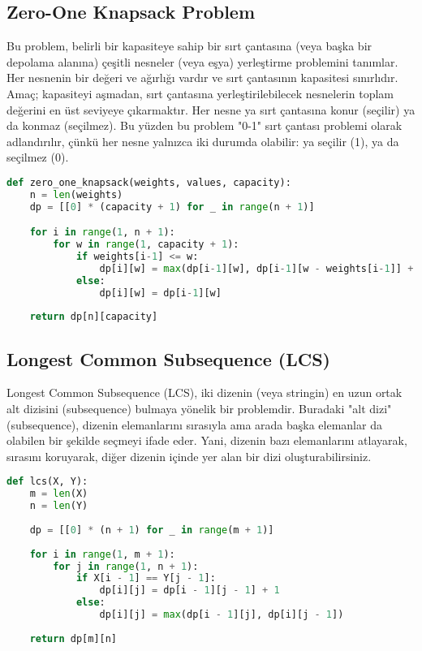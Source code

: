 \newpage

\subsection{Zero-One Knapsack Problem}

Bu problem, belirli bir kapasiteye sahip bir sırt çantasına (veya başka bir depolama alanına) çeşitli nesneler (veya eşya) yerleştirme problemini tanımlar. Her nesnenin bir değeri ve ağırlığı vardır ve sırt çantasının kapasitesi sınırlıdır. Amaç; kapasiteyi aşmadan, sırt çantasına yerleştirilebilecek nesnelerin toplam değerini en üst seviyeye çıkarmaktır. Her nesne ya sırt çantasına konur (seçilir) ya da konmaz (seçilmez). Bu yüzden bu problem "0-1" sırt çantası problemi olarak adlandırılır, çünkü her nesne yalnızca iki durumda olabilir: ya seçilir (1), ya da seçilmez (0).

\begin{lstlisting}[language=Python]
def zero_one_knapsack(weights, values, capacity):
    n = len(weights)
    dp = [[0] * (capacity + 1) for _ in range(n + 1)]

    for i in range(1, n + 1):
        for w in range(1, capacity + 1):
            if weights[i-1] <= w:
                dp[i][w] = max(dp[i-1][w], dp[i-1][w - weights[i-1]] + values[i-1])
            else:
                dp[i][w] = dp[i-1][w]
    
    return dp[n][capacity]
\end{lstlisting}

\newpage

\subsection{Longest Common Subsequence (LCS)}

Longest Common Subsequence (LCS), iki dizenin (veya stringin) en uzun ortak alt dizisini (subsequence) bulmaya yönelik bir problemdir. Buradaki "alt dizi" (subsequence), dizenin elemanlarını sırasıyla ama arada başka elemanlar da olabilen bir şekilde seçmeyi ifade eder. Yani, dizenin bazı elemanlarını atlayarak, sırasını koruyarak, diğer dizenin içinde yer alan bir dizi oluşturabilirsiniz.

\begin{lstlisting}[language=Python]
def lcs(X, Y):
    m = len(X)
    n = len(Y)
    
    dp = [[0] * (n + 1) for _ in range(m + 1)]
    
    for i in range(1, m + 1):
        for j in range(1, n + 1):
            if X[i - 1] == Y[j - 1]:
                dp[i][j] = dp[i - 1][j - 1] + 1
            else:
                dp[i][j] = max(dp[i - 1][j], dp[i][j - 1])
    
    return dp[m][n]
\end{lstlisting}

